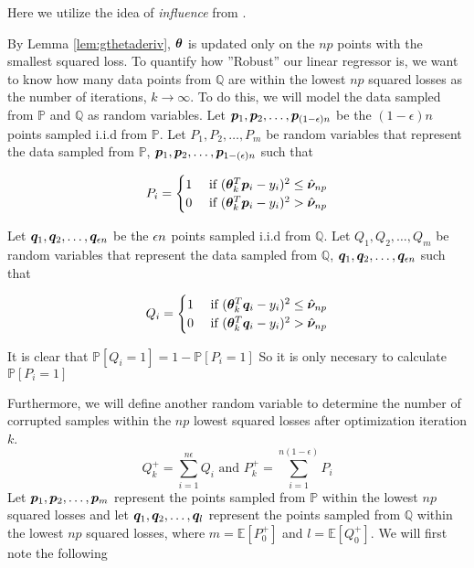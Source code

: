 \documentclass{article} %
\begin{document}
	Here we utilize the idea of \textit{influence} from \cite{McWilliams2014}.

	By Lemma \ref{lem:gthetaderiv}, ${\bm{\theta}}$ is updated only on the $np$ points with the smallest squared loss. To quantify how ''Robust'' our linear regressor is, we want to know how many data points from $\mathbb{Q}$ are within the lowest $np$ squared losses as the number of iterations, $k \to \infty$. To do this, we will model the data sampled from $\mathbb{P}$ and $\mathbb{Q}$ as random variables. Let ${\bm{p}}_1,{\bm{p}}_2,\ldots,{\bm{p}}_{(1-{\epsilon})n}$ be the $(1-\epsilon)n$ points sampled i.i.d from $\mathbb{P}$. Let $P_1,P_2,\dots,P_m$ be random variables that represent the data sampled from $\mathbb{P}$,  ${\bm{p}}_1,{\bm{p}}_2,\dots,{\bm{p}}_{1-({\epsilon})n}$ such that
	
	\begin{equation}
		P_i = \begin{cases}
					1 & \text{ if } ({\bm{\theta}}_k^T{\bm{p}}_i - y_{i})^2 \leq \hat{{\bm{\nu}}}_{np} \\
					0 & \text{ if } ({\bm{\theta}}_k^T{\bm{p}}_i - y_{i})^2 > \hat{{\bm{\nu}}}_{np} \\
				\end{cases}
	\end{equation}
	
	Let ${\bm{q}}_1,{\bm{q}}_2,\ldots,{\bm{q}}_{{\epsilon} n}$ be the ${\epsilon} n$ points sampled i.i.d from $\mathbb{Q}$. Let $Q_1,Q_2,\dots,Q_m$ be random variables that represent the data sampled from $\mathbb{Q}$,  ${\bm{q}}_1,{\bm{q}}_2,\dots,{\bm{q}}_{{\epsilon} n}$ such that
	
	\begin{equation}
		Q_i = \begin{cases}
			1 & \text{ if } ({\bm{\theta}}_k^T{\bm{q}}_i - y_{i})^2 \leq \hat{{\bm{\nu}}}_{np} \\
			0 & \text{ if } ({\bm{\theta}}_k^T{\bm{q}}_i - y_{i})^2 > \hat{{\bm{\nu}}}_{np} \\
		\end{cases}
	\end{equation}

	It is clear that $\displaystyle \mathbb{P}\left[Q_i = 1\right] = 1 - \mathbb{P}\left[P_i = 1\right]$ So it is only necesary to calculate $\mathbb{P}\left[P_i = 1\right]$
	
	Furthermore, we will define another random variable to determine the number of corrupted samples within the $np$ lowest squared losses after optimization iteration $k$.
	\begin{equation}
		Q^+_k = \sum_{i=1}^{n\epsilon} Q_i \text{ and } P^+_k = \sum_{i=1}^{n(1-\epsilon)} P_i
	\end{equation}
	Let ${\bm{p}}_1,{\bm{p}}_2,\dots,{\bm{p}}_m$ represent the points sampled from $\mathbb{P}$ within the lowest $np$ squared losses and let ${\bm{q}}_1,{\bm{q}}_2,\dots,{\bm{q}}_l$ represent the points sampled from $\mathbb{Q}$ within the lowest $np$ squared losses, where $m = \mathbb{E}\left[P_0^+\right]$ and $l = \mathbb{E}\left[Q_0^+\right]$. We will first note the following
	
\end{document}
